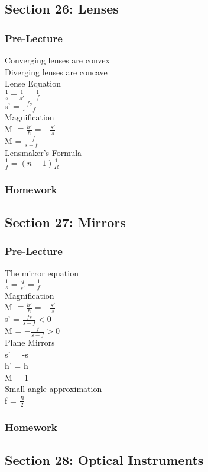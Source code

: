 \documentclass{article}
\begin{document}
\subsection{Section 26: Lenses}
\subsubsection{Pre-Lecture}
\noindent
Converging lenses are convex \\
Diverging lenses are concave \\
Lense Equation \\
$\frac{1}{s} + \frac{1}{s'} = \frac{1}{f}$ \\
s' = $\frac{f s}{s-f}$ \\
Magnification \\
M $\equiv \frac{h'}{h} = -\frac{s'}{s}$\\
M = $\frac{-f}{s-f}$ \\
Lensmaker's Formula \\
$\frac{1}{f} = (n-1)\frac{1}{R}$

\subsubsection{Homework}
\subsection{Section 27: Mirrors}
\subsubsection{Pre-Lecture}
\noindent
The mirror equation \\
$\frac{1}{s} = \frac{q}{s'} = \frac{1}{f}$\\
Magnification \\
M $\equiv \frac{h'}{h} = -\frac{s'}{s}$\\
s' = $\frac{fs}{s-f} \lt 0$\\
M = $-\frac{f}{s-f} \gt 0$ \\
Plane Mirrors \\
s' = -s \\
h' = h \\
M = 1 \\
Small angle approximation \\
f = $\frac{R}{2}$
\subsubsection{Homework}
\subsection{Section 28: Optical Instruments}
\end{document}
